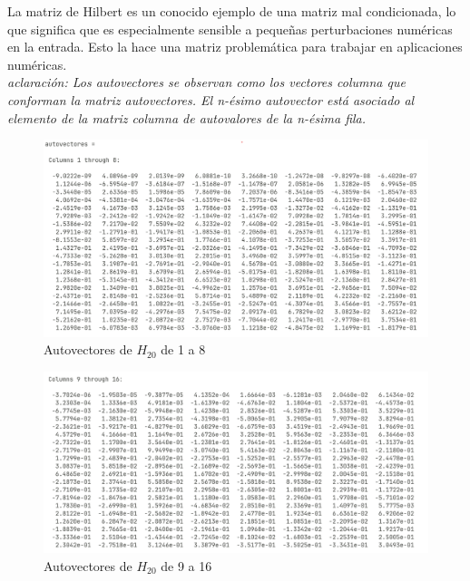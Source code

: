 \documentclass{article}
\begin{document}
La matriz de Hilbert es un conocido ejemplo de una matriz mal condicionada, lo que significa que es especialmente sensible a pequeñas perturbaciones numéricas en la entrada. Esto la hace una matriz problemática para trabajar en aplicaciones numéricas. \\

\textit{aclaración: Los autovectores se observan como los vectores columna que conforman la matriz autovectores. El n-ésimo autovector está asociado al elemento de la matriz columna de autovalores de la n-ésima fila.}
	
\begin{figure}[H]
    \centering
    \includegraphics[width=1\linewidth]{ej2.resultado.1.png}
    \caption{Autovectores de $H_{20}$ de 1 a 8}
    \label{fig:enter-label}
\end{figure}

\begin{figure}[H]
    \centering
    \includegraphics[width=1\linewidth]{ej2.resultado.2.png}
    \caption{Autovectores de $H_{20}$ de 9 a 16}
    \label{fig:enter-label}
\end{figure}
\end{document}
